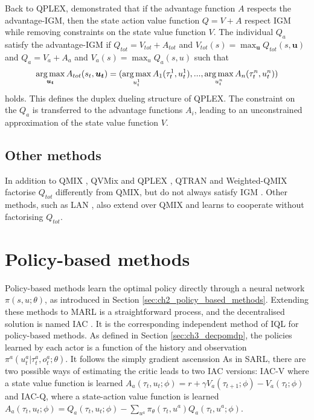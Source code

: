 Back to QPLEX, \citet{wang2021qplex} demonstrated that if the advantage function $A$ respects the advantage-IGM, then the state action value function $Q = V + A$ respect IGM while removing constraints on the state value function $V$.
The individual $Q_a$ satisfy the advantage-IGM if $Q_{tot}=V_{tot}+A_{tot}$ and $V_{tot}(s)=\max_{\mathbf{u}} Q_{tot}(s, \mathbf{u})$ and $Q_a=V_a+A_a$ and $V_a(s)=\max_{u} Q_a(s, u)$ such that 
\begin{equation}
    \argmax_{\mathbf{u_t}} A_{tot}(s_t, \mathbf{u_t}) =(\argmax_{u_t^{1}} A_{1}(\tau_t^{1}, u_t^{1}),...,\argmax_{u_t^{n}} A_{n}(\tau_t^{n}, u_t^{n}))    \label{eq:ch3_adv_igm}
\end{equation}
holds.
This defines the duplex dueling structure of QPLEX.
The constraint on the $Q_a$ is transferred to the advantage functions $A_i$, leading to an unconstrained approximation of the state value function $V$.

\subsection{Other methods}
In addition to QMIX \citep{Rashid2018}, QVMix \citep{leroy2020qvmix} and QPLEX \citep{wang2021qplex}, QTRAN \citep{Son2019QTRAN:Learning} and Weighted-QMIX \citep{rashid2020weighted} factorise $Q_{tot}$ differently from QMIX, but do not always satisfy IGM \citep{Son2019QTRAN:Learning}.
Other methods, such as LAN \citep{avalos2023local}, also extend over QMIX and learns to cooperate without factorising $Q_{tot}$.

\section{Policy-based methods}
\label{sec:ch3_policy}
Policy-based methods learn the optimal policy directly through a neural network $\pi(s, u;\theta)$, as introduced in Section \ref{sec:ch2_policy_based_methods}.
Extending these methods to MARL is a straightforward process, and the decentralised solution is named IAC \citep{foerster2017coma}. 
It is the corresponding independent method of IQL for policy-based methods.
As defined in Section \ref{sec:ch3_decpomdp}, the policies learned by each actor is a function of the history and observation $\pi^{a}(u_t^{a}|\tau_t^{a},o_t^{a};\theta)$.
It follows the simply gradient ascenssion 
As in SARL, there are two possible ways of estimating the critic leads to two IAC versions: IAC-V where a state value function is learned $A_a(\tau_t, u_t; \phi) = r + \gamma V_a(\tau_{t+1}; \phi) - V_a(\tau_t; \phi)$ and IAC-Q, where a state-action value function is learned $A_a(\tau_t, u_t; \phi) = Q_a(\tau_t, u_t; \phi) - \sum_{u^a}\pi_\theta(\tau_t, u^a)Q_a(\tau_t, u^a; \phi)$.

